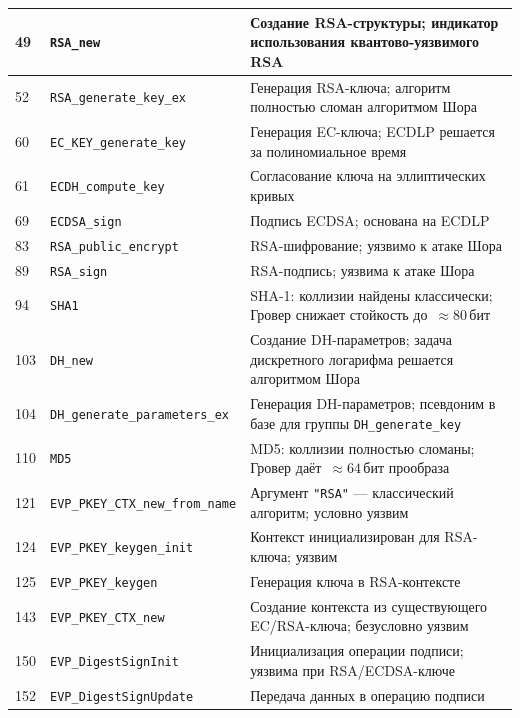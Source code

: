 \begin{longtable}{|p{1.2cm}|p{5.8cm}|p{7.9cm}|}
  49  & \texttt{RSA\_new}                   & Создание RSA-структуры; индикатор использования квантово-уязвимого RSA \\ \hline
  52  & \texttt{RSA\_generate\_key\_ex}      & Генерация RSA-ключа; алгоритм полностью сломан алгоритмом Шора \\ \hline
  60  & \texttt{EC\_KEY\_generate\_key}      & Генерация EC-ключа; ECDLP решается за полиномиальное время \\ \hline
  61  & \texttt{ECDH\_compute\_key}          & Согласование ключа на эллиптических кривых \\ \hline
  69  & \texttt{ECDSA\_sign}                 & Подпись ECDSA; основана на ECDLP \\ \hline
  83  & \texttt{RSA\_public\_encrypt}        & RSA-шифрование; уязвимо к атаке Шора \\ \hline
  89  & \texttt{RSA\_sign}                   & RSA-подпись; уязвима к атаке Шора \\ \hline
  94  & \texttt{SHA1}                        & SHA-1: коллизии найдены классически; Гровер снижает стойкость до~\(\approx80\)\,бит \\ \hline
  103 & \texttt{DH\_new}                     & Создание DH-параметров; задача дискретного логарифма решается алгоритмом Шора \\ \hline
  104 & \texttt{DH\_generate\_parameters\_ex}& Генерация DH-параметров; псевдоним в базе для группы \texttt{DH\_generate\_key} \\ \hline
  110 & \texttt{MD5}                         & MD5: коллизии полностью сломаны; Гровер даёт~\(\approx64\)\,бит прообраза \\ \hline
  121 & \texttt{EVP\_PKEY\_CTX\_new\_from\_name} & Аргумент \texttt{"RSA"} --- классический алгоритм; условно уязвим \\ \hline
  124 & \texttt{EVP\_PKEY\_keygen\_init}     & Контекст инициализирован для RSA-ключа; уязвим \\ \hline
  125 & \texttt{EVP\_PKEY\_keygen}           & Генерация ключа в RSA-контексте \\ \hline
  143 & \texttt{EVP\_PKEY\_CTX\_new}         & Создание контекста из существующего EC/RSA-ключа; безусловно уязвим \\ \hline
  150 & \texttt{EVP\_DigestSignInit}         & Инициализация операции подписи; уязвима при RSA/ECDSA-ключе \\ \hline
  152 & \texttt{EVP\_DigestSignUpdate}       & Передача данных в операцию подписи \\ \hline

\end{longtable}
